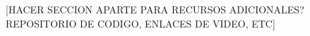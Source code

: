 \begin{thebibliography}{99}

	[HACER SECCION APARTE PARA RECURSOS ADICIONALES? REPOSITORIO DE CODIGO, ENLACES DE VIDEO, ETC]

\end{thebibliography}
